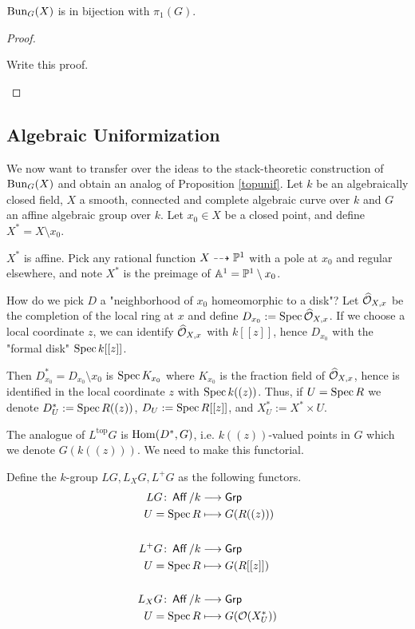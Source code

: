 \documentclass[12pt]{article}
\begin{document}
\begin{cor}
    $\operatorname{Bun}_G(X)$ is in bijection with $\pi_1(G)$. 
\end{cor}

\begin{proof}
    \begin{todo}
        Write this proof.
    \end{todo}
\end{proof}

\subsection{Algebraic Uniformization}\label{unif}

We now want to transfer over the ideas to the stack-theoretic construction of $\operatorname{Bun}_G(X)$ and obtain an analog of Proposition \ref{topunif}. Let $k$ be an algebraically closed field, $X$ a smooth, connected and complete algebraic curve over $k$ and $G$ an affine algebraic group over $k$. Let $x_0 \in X$ be a closed point, and define $X^* = X \setminus x_0$. 
\begin{rem}
    $X^*$ is affine. Pick any rational function $X \dashrightarrow \mathbb{P}^1$ with a pole at $x_0$ and regular elsewhere, and note $X^*$ is the preimage of $\mathbb{A}^1 = \mathbb{P}^1 \setminus x_0$. 
\end{rem}
How do we pick $D$ a "neighborhood of $x_0$ homeomorphic to a disk"? Let $\widehat{\mathcal{O}}_{X,x}$ be the completion of the local ring at $x$ and define $D_{x_0} := \operatorname{Spec} \widehat{\mathcal{O}}_{X,x}$. If we choose a local coordinate $z$, we can identify $\widehat{\mathcal{O}}_{X,x}$ with $k[[z]]$, hence $D_{x_0}$ with the "formal disk" $\operatorname{Spec} k [[z]]$.

Then $D^*_{x_0} = D_{x_0} \setminus x_0$ is $\operatorname{Spec} K_{x_0}$ where $K_{x_0}$ is the fraction field of $\widehat{\mathcal{O}}_{X,x}$, hence is identified in the local coordinate $z$ with $\operatorname{Spec} k ((z))$. Thus, if $U = \operatorname{Spec} R$ we denote $D^*_U := \operatorname{Spec} R ((z))$, $D_U := \operatorname{Spec} R [[z]]$, and $X^*_U := X^* \times U$. 

The analogue of $L^{\text{top}} G$ is $\operatorname{Hom}(D^*, G)$, i.e. $k ((z))$-valued points in $G$ which we denote $G(k ((z)))$. We need to make this functorial.
\begin{defn}
    Define the $k$-group $LG, L_X G, L^+G$ as the following functors.
    \begin{align*}
    LG \colon \operatorname{\mathsf{Aff}}/k &\longrightarrow \operatorname{\mathsf{Grp}} \\
    U = \operatorname{Spec} R &\longmapsto G(R ((z))) \\
     \\
    L^+ G \colon \operatorname{\mathsf{Aff}}/k &\longrightarrow \operatorname{\mathsf{Grp}} \\
    U = \operatorname{Spec} R &\longmapsto G(R [[z]]) \\ 
     \\
    L_X G \colon \operatorname{\mathsf{Aff}}/k &\longrightarrow \operatorname{\mathsf{Grp}} \\
    U = \operatorname{Spec} R &\longmapsto G(\mathcal{O}(X^*_U))
\end{align*}
\end{defn}
\end{document}
